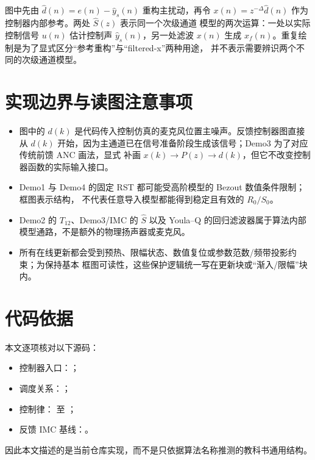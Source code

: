 \documentclass[UTF8,11pt,a4paper]{ctexart}
\newcommand{\diagramnewpage}{%
  \clearpage\mbox{}\thispagestyle{fancy}\vspace{-\baselineskip}}
\begin{document}
图中先由 $\hat d(n)=e(n)-\hat y_s(n)$ 重构主扰动，再令
$x(n)=z^{-\Delta}\hat d(n)$ 作为控制器内部参考。两处 $\hat S(z)$ 表示同一个次级通道
模型的两次运算：一处以实际控制信号 $u(n)$ 估计控制声 $\hat y_s(n)$，另一处滤波
$x(n)$ 生成 $x_f(n)$。重复绘制是为了显式区分“参考重构”与“filtered-x”两种用途，
并不表示需要辨识两个不同的次级通道模型。

\diagramnewpage
\section{实现边界与读图注意事项}

\begin{itemize}
  \item 图中的 $d(k)$ 是代码传入控制仿真的麦克风位置主噪声。反馈控制器图直接从 $d(k)$
  开始，因为主通道已在信号准备阶段生成该信号；Demo3 为了对应传统前馈 ANC 画法，显式
  补画 $x(k)\rightarrow P(z)\rightarrow d(k)$，但它不改变控制器函数的实际输入接口。
  \item Demo1 与 Demo4 的固定 RST 都可能受高阶模型的 Bezout 数值条件限制；框图表示结构，
  不代表任意导入模型都能得到稳定且有效的 $R_0/S_0$。
  \item Demo2 的 $T_{12}$、Demo3/IMC 的 $\hat S$ 以及 Youla--Q 的回归滤波器属于算法内部
  模型通路，不是额外的物理扬声器或麦克风。
  \item 所有在线更新都会受到预热、限幅状态、数值复位或参数范数/频带投影约束；为保持基本
  框图可读性，这些保护逻辑统一写在更新块或“渐入/限幅”块内。
\end{itemize}

\sloppy
\section{代码依据}

本文逐项核对以下源码：
\begin{itemize}
  \item 控制器入口：；
  \item 调度关系：；
  \item 控制律： 至
  ；
  \item 反馈 IMC 基线：。
\end{itemize}
因此本文描述的是当前仓库实现，而不是只依据算法名称推测的教科书通用结构。
\end{document}
